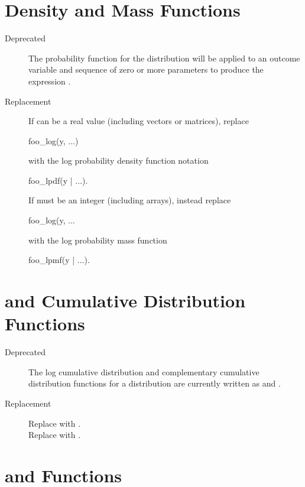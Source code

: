 \section{ Density and Mass Functions}

\begin{description}
\item[Deprecated] The probability function for the distribution
   will be applied to an outcome variable  and
  sequence of zero or more parameters  to produce the
  expression .
\item[Replacement] If  can be a real value (including vectors
or matrices), replace 
%
\begin{stancode}
foo_log(y, ...)
\end{stancode}
%
with the log probability density function notation
%
\begin{stancode}
foo_lpdf(y | ...).
\end{stancode}
%
If  must be an integer (including arrays),
instead replace
%
\begin{stancode}
foo_log(y, ...
\end{stancode}
%
with the log probability mass function
%
\begin{stancode}
foo_lpmf(y | ...).
\end{stancode}
\end{description}

\section{ and  Cumulative Distribution
  Functions} 

\begin{description}
\item[Deprecated] 
The log cumulative distribution and complementary cumulative
distribution functions for a distribution  are currently
written as  and .  
\item[Replacement]
Replace  with .
\\[4pt]
Replace  with .
\end{description}

\section{ and  Functions}

